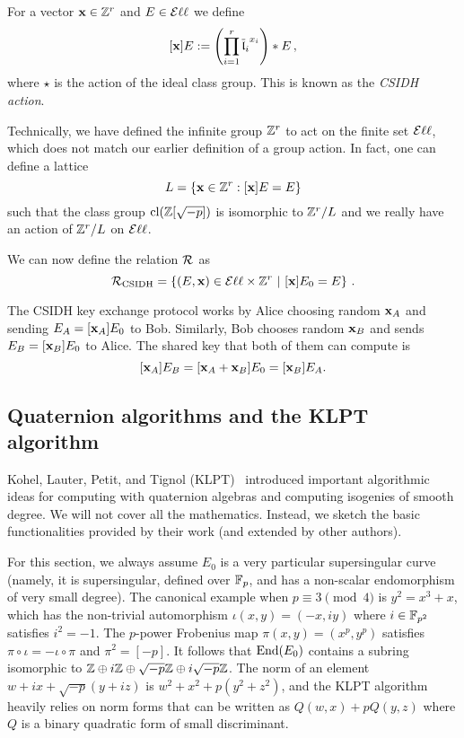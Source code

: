 For a vector $\bx \in \mathbb{Z}^r$ and $E \in \Ell$ we define \[ [\bx]E := \left( \prod_{i=1}^r {\overline{\fl}_i}^{x_i} \right) \star E  \, , \] where $\star$ is the action of the ideal class group.
This is known as the \emph{CSIDH action}. 

Technically, we have defined the infinite group $\Z^r$ to act on the finite set $\Ell$, which does not match our earlier definition of a group action.
In fact, one can define a lattice
\[
  L = \{ \bx \in \Z^r : [\bx]E = E \}
\]
such that the class group $\cl( \Z[\sqrt{-p}])$ is isomorphic to $\Z^r/L$ and we really have an action of $\Z^r/L$ on $\Ell$.
 


We can now define the relation $\R$ as
\[
\R[CSIDH] = \left\{ (E,\bx) \in \Ell \times \mathbb{Z}^r \,\, | \,\, [\bx]E_0 = E \right\} \,.
\]

The CSIDH key exchange protocol works by Alice choosing random $\bx_A$ and sending $E_A = [\bx_A]E_0$ to Bob. Similarly, Bob chooses random $\bx_B$ and sends $E_B = [\bx_B]E_0$ to Alice. The shared key that both of them can compute is
\[
  [\bx_A]E_B = [\bx_A+\bx_B]E_0 = [\bx_B]E_A.
\]


\subsection{Quaternion algorithms and the KLPT algorithm}\label{sec:KLPT}

Kohel, Lauter, Petit, and Tignol (KLPT)~\cite{KLPT} introduced important algorithmic ideas for computing with quaternion algebras and computing isogenies of smooth degree.
We will not cover all the mathematics. Instead, we sketch the basic functionalities provided by their work (and extended by other authors).

For this section, we always assume $E_0$ is a very particular supersingular curve (namely, it is supersingular, defined over $\F_p$, and has a non-scalar endomorphism of very small degree).
The canonical example when $p \equiv 3 \pmod{4}$ is $y^2 = x^3 + x$, which has the non-trivial automorphism $\iota(x,y) = (-x,iy)$ where $i \in \F_{p^2}$ satisfies $i^2 = -1$.
The $p$-power Frobenius map $\pi(x,y) = (x^p, y^p)$ satisfies $\pi \circ \iota = - \iota \circ \pi$ and $\pi^2 = [-p]$.
It follows that $\End(E_0)$ contains a subring isomorphic to $\Z \oplus i\Z \oplus \sqrt{-p} \Z \oplus i \sqrt{-p}\Z $.
The norm of an element $w + ix + \sqrt{-p}( y + iz)$ is $w^2 + x^2 + p( y^2 + z^2)$, and the KLPT algorithm heavily relies on norm forms that can be written as $Q(w,x) + p Q(y,z)$ where $Q$ is a binary quadratic form of small discriminant.

